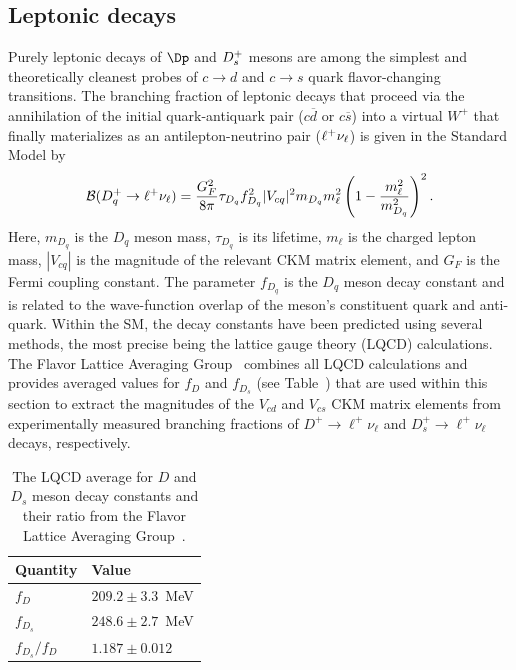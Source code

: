 \subsection{Leptonic decays}

Purely leptonic decays of $\Dp$ and $D_{s}^+$ mesons are among the simplest and theoretically cleanest
probes of $c\to d$ and $c\to s$ quark flavor-changing transitions. The branching fraction of leptonic 
decays that proceed via the annihilation of the initial quark-antiquark pair ($c\overline{d}$ or 
$c\overline{s}$) into a virtual $W^+$ that finally materializes as an antilepton-neutrino pair ($\ell^+\nu_{\ell}$) is 
given in the Standard Model by
\begin{equation}
 {\cal B}(D_{q}^+\to \ell^+\nu_{\ell})=\frac{G_F^2}{8\pi}\tau_{D_q}f_{D_{q}}^2|V_{cq}|^2m_{D_{q}}m_{\ell}^2\left(1-\frac{m_{\ell}^2}{m_{D_{q}}^2} \right)^2.
 \label{eq:brCharmLeptonicSM}
\end{equation}
Here, $m_{D_{q}}$ is the $D_{q}$ meson mass, $\tau_{D_q}$ is its lifetime, $m_{\ell}$ is the charged lepton mass, 
$|V_{cq}|$ is the magnitude of the relevant CKM matrix element, and $G_F$ is the Fermi coupling constant. The parameter 
$f_{D_{q}}$ is the $D_q$ meson decay constant and is related to the wave-function overlap of the meson's 
constituent quark and anti-quark. Within the SM, the decay constants have been predicted using several 
methods, the most precise being the lattice gauge theory (LQCD) calculations. The Flavor Lattice Averaging 
Group~\cite{FLAG} combines all LQCD calculations and provides averaged values for $f_D$ and $f_{D_s}$ (see 
Table~\cite{FLAG}) that are used within this section to extract the magnitudes of the $V_{cd}$ and $V_{cs}$ CKM
matrix elements from experimentally measured branching fractions of $D^+\to \ell^+\nu_{\ell}$ and 
$D_s^+\to \ell^+\nu_{\ell}$ decays, respectively.
\begin{table}[b!]
\caption{The LQCD average for $D$ and $D_s$ meson decay constants and their ratio from the Flavor Lattice Averaging 
Group~\cite{FLAG}.
\label{tab:Lattice}}
\begin{center}
\begin{tabular}{ll}
\toprule
\rowcolor{gray} Quantity & Value \\ 
\midrule
$f_D$ 		& $209.2\pm3.3$~MeV\\
$f_{D_s}$ 	& $248.6\pm2.7$~MeV\\
$f_{D_s}/f_D$	& $1.187\pm0.012$
\\ \bottomrule
\end{tabular}
\end{center}
\end{table}


